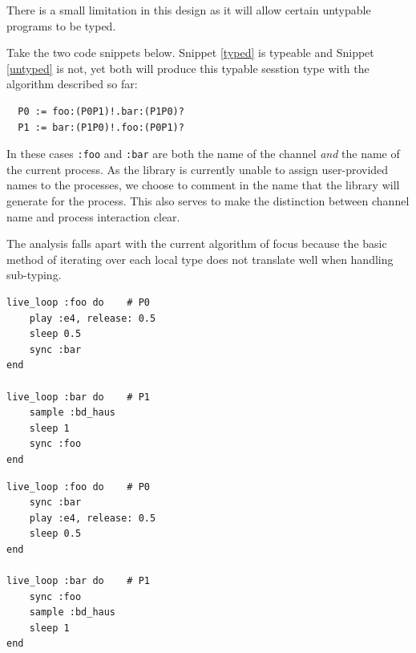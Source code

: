 \documentclass[11pt, abstracton, twoside, titlepage=true]{scrartcl}
\begin{document}


There is a small limitation in this design as it will allow certain untypable
programs to be typed.

Take the two code snippets below. Snippet \ref{typed} is typeable and Snippet 
\ref{untyped} is not, yet both will produce this typable sesstion type with the 
algorithm described so far:
\\
\begin{lstlisting}
  P0 := foo:(P0P1)!.bar:(P1P0)?
  P1 := bar:(P1P0)!.foo:(P0P1)?
\end{lstlisting}

In these cases \texttt{:foo} and \texttt{:bar} are both the name of the channel 
\emph{and} the name of the current process. As the library is currently unable to 
assign user-provided names to the processes, we choose to comment in the name that 
the library will generate for the process. This also serves to make the distinction 
between channel name and process interaction clear.

The analysis falls apart with the current algorithm of focus because the basic method 
of iterating over each local type does not translate well when handling sub-typing.

\begin{multicols}{2} 
	\begin{minipage}{0.4\textwidth}
		\begin{lstlisting}[style = sonicpi]
live_loop :foo do    # P0
    play :e4, release: 0.5
    sleep 0.5
    sync :bar
end

live_loop :bar do    # P1
    sample :bd_haus
    sleep 1
    sync :foo
end
		\end{lstlisting}
		 \label{untyped}
	\end{minipage} \hspace{35pt}
	\begin{minipage}{0.4\textwidth}
		\begin{lstlisting}[style = sonicpi]
live_loop :foo do    # P0
    sync :bar
    play :e4, release: 0.5
    sleep 0.5
end

live_loop :bar do    # P1
    sync :foo
    sample :bd_haus
    sleep 1
end
		\end{lstlisting}
		 \label{typed}
	\end{minipage}
\end{multicols}
\newpage
\end{document}
